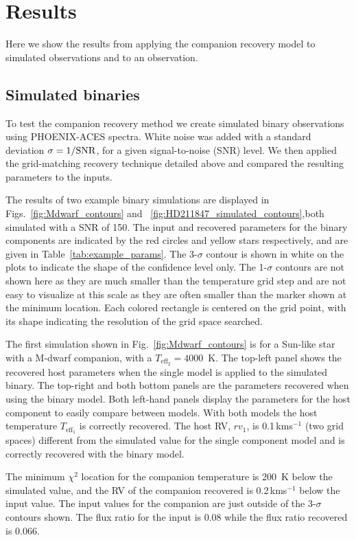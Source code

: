 \documentclass[fleqn,usenatbib]{mnras}
\newcommand{\kmps}{\,kms\(^{-1}\)}	%
\begin{document}
\section{Results}
\label{sec:results}
Here we show the results from applying the companion recovery model to simulated observations and to an observation.


\subsection{Simulated binaries}
\label{subsec:simulated_binaries}
To test the companion recovery method we create simulated binary observations using PHOENIX-ACES spectra. White noise was added with a standard deviation \(\rm \sigma = 1/SNR\), for a given signal-to-noise (SNR) level. We then applied the grid-matching recovery technique detailed above and compared the resulting parameters to the inputs. 

The results of two example binary simulations are displayed in Figs.~\ref{fig:Mdwarf_contours} and ~\ref{fig:HD211847_simulated_contours},both simulated with a SNR of 150. The input and recovered parameters for the binary components are indicated by the red circles and yellow stars respectively, and are given in Table~\ref{tab:example_params}. 
The 3-\(\sigma\) contour is shown in white on the plots to indicate the shape of the confidence level only. The 1-\(\sigma\) contours are not shown here as they are much smaller than the temperature grid step and are not easy to visualize at this scale as they are often smaller than the marker shown at the minimum location. Each colored rectangle is centered on the grid point, with its shape indicating the resolution of the grid space searched.

The first simulation shown in Fig.~\ref{fig:Mdwarf_contours} is for a Sun-like star with a M-dwarf companion, with a \(T_{\textrm{eff}_2} =4000\)~K. The top-left panel shows the recovered host parameters when the single model is applied to the simulated binary. The top-right and both bottom panels are the parameters recovered when using the binary model. Both left-hand panels display the parameters for the host component to easily compare between models. With both models the host temperature \(T_{\textrm{eff}_1}\) is correctly recovered. The host RV, \({rv}_1\), is 0.1\kmps{} (two grid spaces) different from the simulated value for the single component model and is correctly recovered with the binary model.

The minimum \(\chi^2\) location for the companion temperature is 200~K below the simulated value, and the RV of the companion recovered is 0.2\kmps{} below the input value. The input values for the companion are just outside of the 3-\(\sigma\) contours shown. The flux ratio for the input is 0.08 while the flux ratio recovered is 0.066. 
\end{document}
